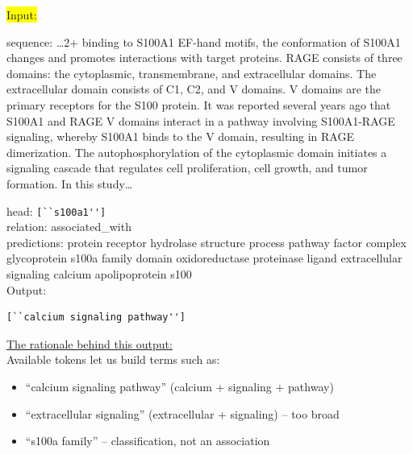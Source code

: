 \documentclass[10pt]{article}
\newcommand{\ours}{\textsc{GraphMERT}\xspace}
\begin{document}
\begin{appendices}
\begin{tcolorbox}[
    title=Few-Shot Example for Combining \ours-predicted Top Tokens Prompt,
    halign title=center,
  colback=white,        %
  colframe=blue,       %
  breakable,
  boxrule=0.8pt,        %
  arc=4mm,              %
  left=4pt,             %
  right=4pt,            %
  top=4pt,              %
  bottom=4pt,            %
  fontupper=\small
]
\colorbox{Yellow}{Input:}\\
\begin{mdframed}[backgroundcolor=Yellow!20,skipabove=1em,skipbelow=1em,]
sequence: \dots 2+ binding to S100A1 EF-hand motifs, the conformation of S100A1 changes and promotes interactions with target proteins. RAGE consists of three domains: the cytoplasmic, transmembrane, and extracellular domains. The extracellular domain consists of C1, C2, and V domains. V domains are the primary receptors for the S100 protein. It was reported several years ago that S100A1 and RAGE V domains interact in a pathway involving S100A1-RAGE signaling, whereby S100A1 binds to the V domain, resulting in RAGE dimerization. The autophosphorylation of the cytoplasmic domain initiates a signaling cascade that regulates cell proliferation, cell growth, and tumor formation. In this study\dots
\end{mdframed}

head: \verb|[``s100a1'']|\\
relation: associated\_with\\
predictions: protein receptor hydrolase structure process pathway factor complex glycoprotein s100a family domain oxidoreductase proteinase ligand extracellular signaling calcium apolipoprotein s100\\

Output:
\begin{verbatim}
[``calcium signaling pathway'']
\end{verbatim}

\underline{The rationale behind this output:}\\
\noindent Available tokens let us build terms such as:
\begin{itemize}
  \item ``calcium signaling pathway'' (calcium + signaling + pathway)
  \item ``extracellular signaling'' (extracellular + signaling) -- too broad
  \item ``s100a family'' -- classification, not an association
\end{itemize}


\end{tcolorbox}
\end{appendices}
\end{document}
